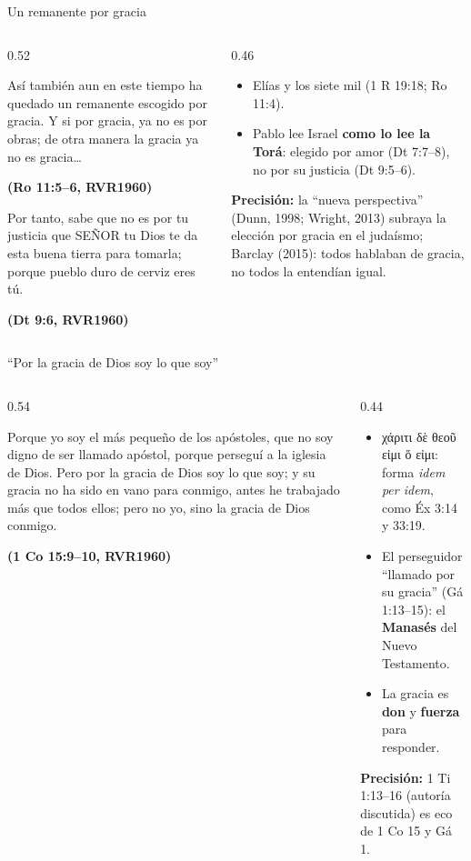 \documentclass[hyperref={bookmarks=false},aspectratio=169]{beamer}
\newcommand{\grc}[1]{\foreignlanguage{ancientgreek}{#1}}
\newcommand{\SENOR}{S{\fontsize{0.78em}{1em}\selectfont EÑOR}}
\newcommand{\fuente}[1]{\par\hfill{\upshape\bfseries\footnotesize\textcolor{azul}{#1}}}
\newcommand{\destacar}[1]{\textbf{\textcolor{azul}{#1}}}
\newcommand{\precision}[1]{{\footnotesize\color{gris}\textbf{Precisión:} #1}}
\begin{document}
\begin{frame}{Un remanente por gracia}
\begin{columns}[c,onlytextwidth]
\begin{column}{0.52\textwidth}
\begin{cita}Así también aun en este tiempo ha quedado un remanente escogido por gracia. Y si por gracia, ya no es por obras; de otra manera la gracia ya no es gracia\ldots\fuente{(Ro 11:5--6, RVR1960)}\end{cita}
\begin{cita}Por tanto, sabe que no es por tu justicia que \SENOR{} tu Dios te da esta buena tierra para tomarla; porque pueblo duro de cerviz eres tú.\fuente{(Dt 9:6, RVR1960)}\end{cita}
\end{column}
\begin{column}{0.46\textwidth}\small\RaggedRight
\begin{itemize}
\item Elías y los siete mil (1 R 19:18; Ro 11:4).
\item Pablo lee Israel \destacar{como lo lee la Torá}: elegido por amor (Dt 7:7--8), no por su justicia (Dt 9:5--6).
\end{itemize}
\precision{la ``nueva perspectiva'' (Dunn, 1998; Wright, 2013) subraya la elección por gracia en el judaísmo; Barclay (2015): todos hablaban de gracia, no todos la entendían igual.}
\end{column}
\end{columns}
\end{frame}

\begin{frame}{``Por la gracia de Dios soy lo que soy''}
\begin{columns}[c,onlytextwidth]
\begin{column}{0.54\textwidth}
\begin{cita}Porque yo soy el más pequeño de los apóstoles, que no soy digno de ser llamado apóstol, porque perseguí a la iglesia de Dios. Pero por la gracia de Dios soy lo que soy; y su gracia no ha sido en vano para conmigo, antes he trabajado más que todos ellos; pero no yo, sino la gracia de Dios conmigo.\fuente{(1 Co 15:9--10, RVR1960)}\end{cita}
\end{column}
\begin{column}{0.44\textwidth}\small\RaggedRight
\begin{itemize}
\item \grc{χάριτι δὲ θεοῦ εἰμι ὅ εἰμι}: forma \emph{idem per idem}, como Éx 3:14 y 33:19.
\item El perseguidor ``llamado por su gracia'' (Gá 1:13--15): el \destacar{Manasés} del Nuevo Testamento.
\item La gracia es \destacar{don} y \destacar{fuerza} para responder.
\end{itemize}
\precision{1 Ti 1:13--16 (autoría discutida) es eco de 1 Co 15 y Gá 1.}
\end{column}
\end{columns}
\end{frame}
\end{document}
